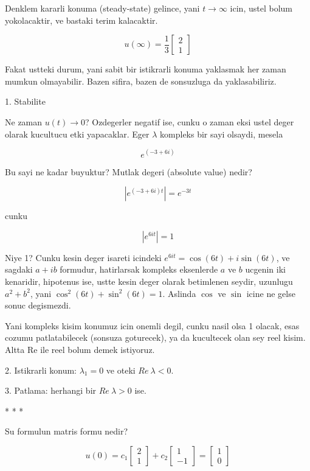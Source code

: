 \documentclass[12pt,fleqn]{article}\usepackage{../common}
\begin{document}
Denklem kararli konuma (steady-state) gelince, yani $t \rightarrow \infty$ icin,
ustel bolum yokolacaktir, ve bastaki terim kalacaktir. 

\[ u(\infty) =
\frac{1}{3}
\left[\begin{array}{c}
2 \\ 1
\end{array}\right]
 \]

Fakat ustteki durum, yani sabit bir istikrarli konuma yaklasmak her zaman
mumkun olmayabilir. Bazen sifira, bazen de sonsuzluga da yaklasabiliriz. 

1. Stabilite 

Ne zaman $u(t) \rightarrow 0$? Ozdegerler negatif ise, cunku o zaman eksi
ustel deger olarak kucultucu etki yapacaklar. Eger $\lambda$ kompleks bir
sayi olsaydi, mesela 

\[ e^{(-3 + 6i)} \]

Bu sayi ne kadar buyuktur? Mutlak degeri (absolute value) nedir? 

\[ | e^{(-3 + 6i)t}| = e^{-3t} \]

cunku 

\[ |e^{6it}| = 1 \]

Niye 1? Cunku kesin deger isareti icindeki $e^{6it} = \cos(6t)+i\sin(6t)$, ve
sagdaki $a+ib$ formudur, hatirlarsak kompleks eksenlerde $a$ ve $b$ ucgenin
iki kenaridir, hipotenus ise, ustte kesin deger olarak betimlenen seydir,
uzunlugu $a^2 + b^2$, yani $\cos^2(6t) + \sin^2(6t) = 1$. Aslinda $\cos$ ve
$\sin$ icine ne gelse sonuc degismezdi. 

Yani kompleks kisim konumuz icin onemli degil, cunku nasil olsa 1 olacak,
esas cozumu patlatabilecek (sonsuza goturecek), ya da kucultecek olan sey
reel kisim. Altta Re ile reel bolum demek istiyoruz.

2. Istikrarli konum: $\lambda_1 = 0$ ve oteki $Re \ \lambda < 0$. 

3. Patlama: herhangi bir $Re \ \lambda > 0$ ise. 

* * * 

Su formulun matris formu nedir?

\[ u(0) =
c_1 
\left[\begin{array}{c}
2 \\ 1
\end{array}\right]
+
c_2 
\left[\begin{array}{c}
1 \\ -1
\end{array}\right] 
=
\left[\begin{array}{c}
1 \\ 0
\end{array}\right] 
\]
\end{document}
